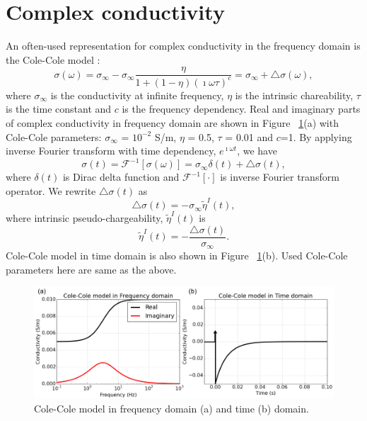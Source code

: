 \documentclass[a4paper, 11pt]{article}
\newcommand{\siginf}{\sigma_\infty}
\newcommand{\dsig}{\triangle\sigma}
\newcommand{\peta}{\tilde{\eta}}
\begin{document}
\section{Complex conductivity}
An often-used representation for complex conductivity in the frequency domain is the Cole-Cole model \cite{COLE}:
\begin{equation}
  \sigma(\omega) = \sigma_{\infty} - \sigma_{\infty}\frac{\eta}{1+(1-\eta)(\imath\omega\tau)^c} = \sigma_{\infty} + \triangle\sigma(\omega),
  \label{eq: sigma_freq}
\end{equation}
where $\sigma_{\infty}$ is the conductivity at infinite frequency, $\eta$ is the intrinsic chareability, $\tau$ is the time constant and $c$ is the frequency dependency. Real and imaginary parts of complex conductivity in frequency domain are shown in Figure ~\ref{Fig:FDandTDCole}(a) with Cole-Cole parameters: $\siginf$ = $10^{-2}$ S/m, $\eta $ = 0.5, $\tau$ = 0.01 and $c$=1. By applying inverse Fourier transform with time dependency, $e^{\imath\omega t}$, we have
\begin{equation}
  \sigma(t) = \mathscr{F}^{-1}[\sigma(\omega)] = \sigma_{\infty}\delta(t) + \triangle\sigma(t),
  \label{eq: sigma_time}
\end{equation}
where $\delta(t)$ is Dirac delta function and $\mathscr{F}^{-1}[\cdot]$ is inverse Fourier transform operator. 
We rewrite $\dsig(t)$ as 
\begin{equation}
  \dsig(t) = - \siginf\peta^{I}(t),
  \label{eq: sigma_time_c1}
\end{equation}
where intrinsic pseudo-chargeability, $\peta^{I}(t)$ is
\begin{equation}
    \peta^{I}(t) = -\frac{\dsig(t)}{\siginf}. %
    \label{eq: intrinsic_peta}
\end{equation}
Cole-Cole model in time domain is also shown in Figure ~\ref{Fig:FDandTDCole}(b). Used Cole-Cole parameters here are same as the above.

\begin{figure}
  \centering
  \includegraphics[width=1.0\textwidth]{figures/FDandTDCole.png}
  \caption{Cole-Cole model in frequency domain (a) and time (b) domain. }
  \label{Fig:FDandTDCole}
\end{figure}
\end{document}
